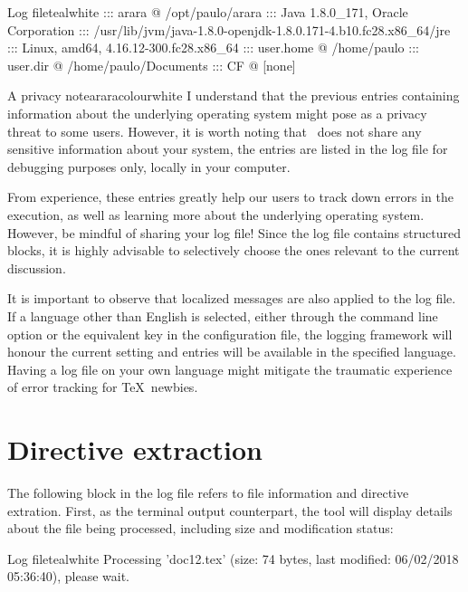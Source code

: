 \begin{codebox}{Log file}{teal}{\icnote}{white}
::: arara @ /opt/paulo/arara
::: Java 1.8.0_171, Oracle Corporation
::: /usr/lib/jvm/java-1.8.0-openjdk-1.8.0.171-4.b10.fc28.x86_64/jre
::: Linux, amd64, 4.16.12-300.fc28.x86_64
::: user.home @ /home/paulo
::: user.dir @ /home/paulo/Documents
::: CF @ [none]
\end{codebox}

\begin{messagebox}{A privacy note}{araracolour}{\icok}{white}
\setlength{\parskip}{1em}
I understand that the previous entries containing information about the underlying operating system might pose as a privacy threat to some users. However, it is worth noting that \arara\ does not share any sensitive information about your system, the entries are listed in the log file for debugging purposes only, locally in your computer.

From experience, these entries greatly help our users to track down errors in the execution, as well as learning more about the underlying operating system. However, be mindful of sharing your log file! Since the log file contains structured blocks, it is highly advisable to selectively choose the ones relevant to the current discussion.
\end{messagebox}

It is important to observe that localized messages are also applied to the log file. If a language other than English is selected, either through the  command line option or the equivalent key in the configuration file, the logging framework will honour the current setting and entries will be available in the specified language. Having a log file on your own language might mitigate the traumatic experience of error tracking for \TeX\ newbies.

\section{Directive extraction}
\label{sec:directiveextraction}

The following block in the log file refers to file information and directive extration. First, as the terminal output counterpart, the tool will display details about the file being processed, including size and modification status:

\begin{codebox}{Log file}{teal}{\icnote}{white}
Processing 'doc12.tex' (size: 74 bytes, last modified:
06/02/2018 05:36:40), please wait.
\end{codebox}

